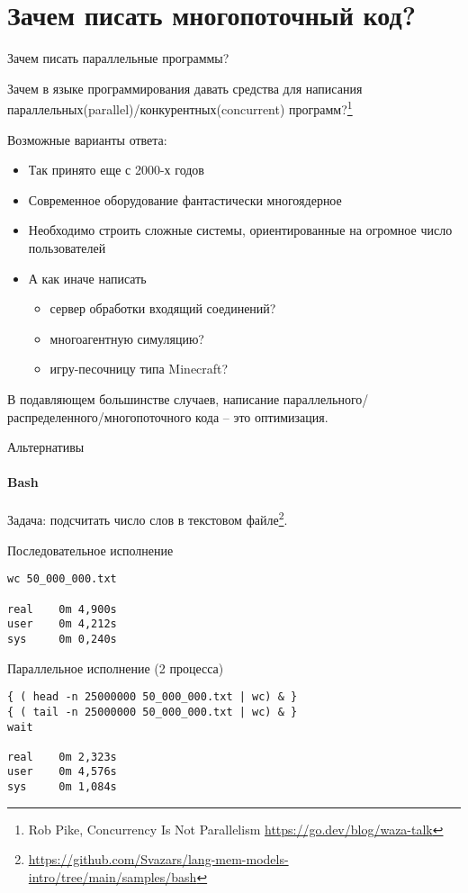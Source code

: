 

\section{Зачем писать многопоточный код?}
\showTOC


\begin{frame}{Зачем писать параллельные программы?}

Зачем в языке программирования давать средства для написания параллельных(parallel)/конкурентных(concurrent) программ?\footnote{\tiny Rob Pike, Concurrency Is Not Parallelism  \url{https://go.dev/blog/waza-talk}}

\pause

Возможные варианты ответа:
\begin{itemize}
 \pause
 \item Так принято еще с 2000-х годов

 \pause
 \item Современное оборудование фантастически многоядерное

 \pause
 \item Необходимо строить сложные системы, ориентированные на огромное число пользователей

 \pause
 \item А как иначе написать 
 \begin{itemize}
    \item сервер обработки входящий соединений?
    \item многоагентную симуляцию?
    \item игру-песочницу типа Minecraft?
 \end{itemize}
\end{itemize}

\pause

В подавляющем большинстве случаев, написание параллельного/распределенного/многопоточного кода -- это оптимизация.

\end{frame}


\begin{frame}[fragile]{Альтернативы}
\framesubtitle{Bash}

Задача: подсчитать число слов в текстовом файле\footnote{\tiny\url{https://github.com/Svazars/lang-mem-models-intro/tree/main/samples/bash}}.

\pause
Последовательное исполнение
\begin{lstlisting}
wc 50_000_000.txt

real    0m 4,900s
user    0m 4,212s
sys     0m 0,240s
\end{lstlisting}

\pause 
Параллельное исполнение (2 процесса)
\begin{lstlisting}
{ ( head -n 25000000 50_000_000.txt | wc) & }
{ ( tail -n 25000000 50_000_000.txt | wc) & }
wait

real    0m 2,323s
user    0m 4,576s
sys     0m 1,084s
\end{lstlisting}

\end{frame}

